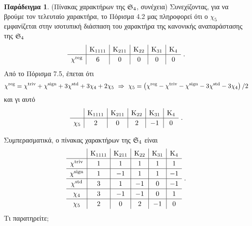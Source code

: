 \documentclass[12pt,a4paper,reqno]{amsart}
\theoremstyle{definition}
\newtheorem*{example}{Παράδειγμα}
\begin{document}
\begin{example}{\rm(Πίνακας χαρακτήρων της $\mathfrak{S}_4$, συνέχεια)}
    Συνεχίζοντας, για να βρούμε τον τελευταίο χαρακτήρα, το Πόρισμα 4.2 μας πληροφορεί ότι ο $\chi_5$ εμφανίζεται στην ισοτυπική διάσπαση του χαρακτήρα της κανονικής αναπαράστασης της $\mathfrak{S}_4$
    \[
    \renewcommand{\arraystretch}{1.2} 
    \begin{array}{c|c|c|c|c|c}
              & \rmK_{1111}  & \rmK_{211}  & \rmK_{22} & \rmK_{31} & \rmK_4  \\ \hline
    \chi^\reg & 6            & 0           & 0         & 0         & 0 
    \end{array}\ .
    \]
    Από το Πόρισμα 7.5, έπεται ότι 
    \[
    \chi^\reg = \chi^\triv + \chi^\sign + 3\chi^\std + 3\chi_4 + 2\chi_5 \ \then \ 
    \chi_5 = \left(\chi^\reg - \chi^\triv - \chi^\sign - 3\chi^\std - 3\chi_4\right)/2
    \]
    και γι αυτό 
    \[
    \renewcommand{\arraystretch}{1.2} 
    \begin{array}{c|c|c|c|c|c}
           & \rmK_{1111}  & \rmK_{211}  & \rmK_{22} & \rmK_{31} & \rmK_4  \\ \hline
    \chi_5 & 2            & 0           & 2         & -1        & 0 
    \end{array}\ .
    \]

    Συμπερασματικά, ο πίνακας χαρακτήρων της $\mathfrak{S}_4$ είναι 
    \[
    \renewcommand{\arraystretch}{1.2} 
    \begin{array}{c|c|c|c|c|c}
               & \rmK_{1111}  & \rmK_{211}  & \rmK_{22} & \rmK_{31} & \rmK_4  \\ \hline
    \chi^\triv & 1            & 1           & 1         & 1         & 1 \\ \hline 
    \chi^\sign & 1            & -1          & 1         & 1         & -1 \\ \hline 
    \chi^\std  & 3            & 1           & -1        & 0         & -1  \\ \hline 
    \chi_4     & 3            & -1          & -1        & 0         & 1 \\ \hline 
    \chi_5     & 2            & 0           & 2         & -1        & 0
    \end{array}\ .
    \]
    Τι παρατηρείτε;
\end{example}
\end{document}

